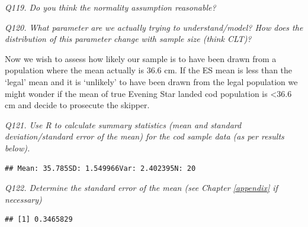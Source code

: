 \documentclass[
  11pt,
  a4paper,
]{book}
\newenvironment{Shaded}{\begin{snugshade}}{\end{snugshade}}
\newcommand{\FunctionTok}[1]{\textcolor[rgb]{0.00,0.00,0.00}{#1}}
\newcommand{\NormalTok}[1]{#1}
\newcommand{\SpecialCharTok}[1]{\textcolor[rgb]{0.00,0.00,0.00}{#1}}
\newcommand{\StringTok}[1]{\textcolor[rgb]{0.31,0.60,0.02}{#1}}
\begin{document}
\emph{Q119. Do you think the normality assumption reasonable?}

\emph{Q120. What parameter are we actually trying to understand/model? How does the distribution of this parameter change with sample size (think CLT)?}

Now we wish to assess how likely our sample is to have been drawn from a population where the mean actually is 36.6 cm. If the ES mean is less than the `legal' mean and it is `unlikely' to have been drawn from the legal population we might wonder if the mean of true Evening Star landed cod population is \textless36.6 cm and decide to prosecute the skipper.

\emph{Q121. Use R to calculate summary statistics (mean and standard deviation/standard error of the mean) for the cod sample data (as per results below).}

\begin{Shaded}
\end{Shaded}

\begin{verbatim}
## Mean: 35.785SD: 1.549966Var: 2.402395N: 20
\end{verbatim}

\emph{Q122. Determine the standard error of the mean (see Chapter \ref{appendix} if necessary)}

\begin{Shaded}
\end{Shaded}

\begin{verbatim}
## [1] 0.3465829
\end{verbatim}
\end{document}

